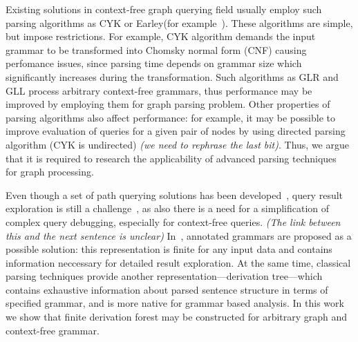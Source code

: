 \documentclass[runningheads,a4paper]{llncs}
\begin{document}

Existing solutions in context-free graph querying field usually employ such parsing algorithms as CYK or Earley(for example~\cite{ConjCFPathQuery,CFGonRDF,GraphQueryWithEarley}). 
These algorithms are simple, but impose restrictions.
For example, CYK algorithm demands the input grammar to be transformed into Chomsky normal form (CNF) causing perfomance issues, since parsing time depends on grammar size which significantly increases during the transformation.
Such algorithms as GLR and GLL process arbitrary context-free grammars, thus performance may be improved by employing them for graph parsing problem.
Other properties of parsing algorithms also affect performance: for example, it may be possible to improve evaluation of queries for a given pair of nodes by using directed parsing algorithm (CYK is undirected) \emph{(we need to rephrase the last bit)}. 
Thus, we argue that it is required to research the applicability of advanced parsing techniques~\cite{Grune} for graph processing. 

Even though a set of path querying solutions has been developed~\cite{GraphQueryWithEarley,ConjCFPathQuery,QueryGraphWithData,RegularDBQuery}, query result exploration is still a challenge~\cite{hofman2015separabilityForRegQueryDebugging}, as also there is a need for a simplification of complex query debugging, especially for context-free queries. \emph{(The link between this and the next sentence is unclear)}
In~\cite{Hellings16}, annotated grammars are proposed as a possible solution: this representation is finite for any input data and contains information neccessary for detailed result exploration.
At the same time, classical parsing techniques provide another representation---derivation tree---which contains exhaustive information about parsed sentence structure in terms of specified grammar, and is more native for grammar based analysis.
In this work we show that finite derivation forest may be constructed for arbitrary graph and context-free grammar.
\end{document}
